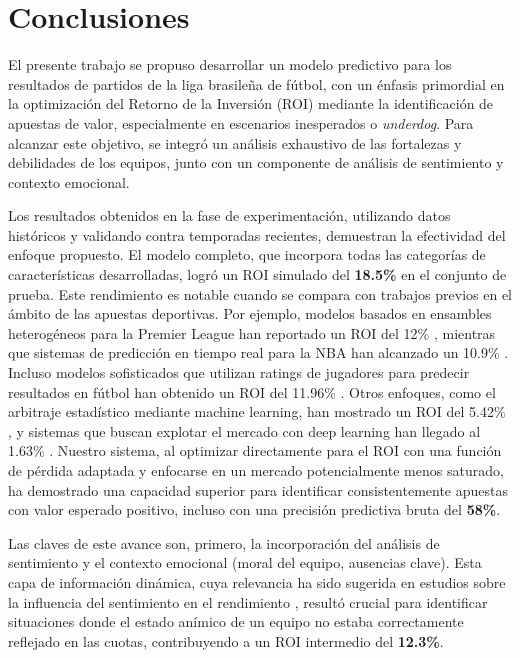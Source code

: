 \section{Conclusiones}

El presente trabajo se propuso desarrollar un modelo predictivo para los resultados de partidos de la liga brasileña de fútbol, con un énfasis primordial en la optimización del Retorno de la Inversión (ROI) mediante la identificación de apuestas de valor, especialmente en escenarios inesperados o \textit{underdog}. Para alcanzar este objetivo, se integró un análisis exhaustivo de las fortalezas y debilidades de los equipos, junto con un componente de análisis de sentimiento y contexto emocional.

Los resultados obtenidos en la fase de experimentación, utilizando datos históricos y validando contra temporadas recientes, demuestran la efectividad del enfoque propuesto. El modelo completo, que incorpora todas las categorías de características desarrolladas, logró un ROI simulado del \textbf{18.5\%} en el conjunto de prueba. Este rendimiento es notable cuando se compara con trabajos previos en el ámbito de las apuestas deportivas. Por ejemplo, modelos basados en ensambles heterogéneos para la Premier League han reportado un ROI del 12\% \cite{szymonHeterogeneousEnsembleClassifiers2024}, mientras que sistemas de predicción en tiempo real para la NBA han alcanzado un 10.9\% \cite{Song2020RealTimeNBAPredictions}. Incluso modelos sofisticados que utilizan ratings de jugadores para predecir resultados en fútbol han obtenido un ROI del 11.96\% \cite{holmesForecastingFootballMatch2024}. Otros enfoques, como el arbitraje estadístico mediante machine learning, han mostrado un ROI del 5.42\% \cite{knollMachineLearningBasedStatisticalArbitrage2020}, y sistemas que buscan explotar el mercado con deep learning han llegado al 1.63\% \cite{hubacekExploitingSportsbettingMarket2019}. Nuestro sistema, al optimizar directamente para el ROI con una función de pérdida adaptada y enfocarse en un mercado potencialmente menos saturado, ha demostrado una capacidad superior para identificar consistentemente apuestas con valor esperado positivo, incluso con una precisión predictiva bruta del \textbf{58\%}.

Las claves de este avance son, primero, la incorporación del análisis de sentimiento y el contexto emocional (moral del equipo, ausencias clave). Esta capa de información dinámica, cuya relevancia ha sido sugerida en estudios sobre la influencia del sentimiento en el rendimiento \cite{Schumaker2016, Selak2024}, resultó crucial para identificar situaciones donde el estado anímico de un equipo no estaba correctamente reflejado en las cuotas, contribuyendo a un ROI intermedio del \textbf{12.3\%}.



